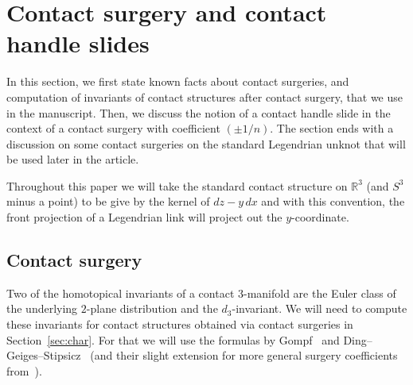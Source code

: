 \documentclass[11pt]{amsart} %
\newcommand{\R}{\mathbb{R}}
\theoremstyle{plain}
\theoremstyle{definition}
\begin{document}
\section{Contact surgery and contact handle slides}
In this section, we first state known facts about contact surgeries, and computation of invariants of contact structures after contact surgery, that we use in the manuscript. Then, we discuss the notion of a contact handle slide in the context of a contact surgery with coefficient $(\pm 1/n)$. The section ends with a discussion on some contact surgeries on the standard Legendrian unknot that will be used later in the article. 

Throughout this paper we will take the standard contact structure on $\R^3$ (and $S^3$ minus a point) to be give by the kernel of $dz-y\, dx$ and with this convention, the front projection of a Legendrian link will project out the $y$-coordinate. 

\subsection{Contact surgery} Two of the homotopical invariants of a contact $3$-manifold are the Euler class of the underlying $2$-plane distribution and the $d_3$-invariant. We will need to compute these invariants for contact structures obtained via contact surgeries in Section~\ref{sec:char}. For that we will use the formulas by Gompf~\cite{Gompf98} and Ding--Geiges--Stipsicz~\cite{DingGeigesStipsicz04} (and their slight extension for more general surgery coefficients from~\cite{DurstKegel16}).
\end{document}
